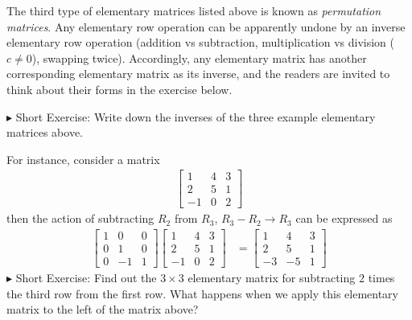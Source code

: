 The third type of elementary matrices listed above is known as \textit{permutation matrices}. Any elementary row operation can be apparently undone by an inverse elementary row operation (addition vs subtraction, multiplication vs division ($c \neq 0$), swapping twice). Accordingly, any elementary matrix has another corresponding elementary matrix as its inverse, and the readers are invited to think about their forms in the exercise below. \par
$\blacktriangleright$ Short Exercise: Write down the inverses of the three example elementary matrices above.\footnotemark\par
For instance, consider a matrix
\begin{align*}
\begin{bmatrix}
1 & 4 & 3 \\
2 & 5 & 1 \\
-1 & 0 & 2
\end{bmatrix}     
\end{align*}
then the action of subtracting $R_2$ from $R_3$, $R_3 - R_2 \to R_3$ can be expressed as
\begin{align*}
\begin{bmatrix}
1 & 0 & 0 \\
0 & 1 & 0 \\
0 & -1 & 1
\end{bmatrix} 
\begin{bmatrix}
1 & 4 & 3 \\
2 & 5 & 1 \\
-1 & 0 & 2
\end{bmatrix} 
&= 
\begin{bmatrix}
1 & 4 & 3 \\
2 & 5 & 1 \\
-3 & -5 & 1
\end{bmatrix} 
\end{align*}
$\blacktriangleright$ Short Exercise: Find out the $3 \times 3$ elementary matrix for subtracting $2$ times the third row from the first row. What happens when we apply this elementary matrix to the left of the matrix above?\footnotemark\par
